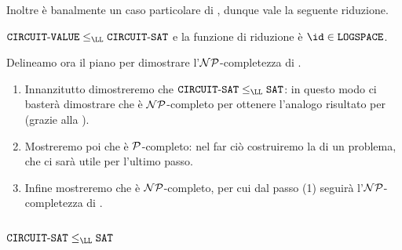Inoltre \CVAL{} è banalmente un caso particolare di \CSAT, dunque vale la seguente
riduzione.

\begin{proposition}
  $\CVAL \leq_{\LL} \CSAT$ e la funzione di riduzione è $\id \in \LOGSPACE$. 
\end{proposition}

Delineamo ora il piano per dimostrare l'$\NP$-completezza di \SAT{}.
\begin{enumerate}[(1)]
  \item Innanzitutto dimostreremo che $\CSAT \leq_{\LL} \SAT$: in questo modo
    ci basterà dimostrare che \CSAT{} è $\NP$-completo per ottenere l'analogo
    risultato per \SAT{} (grazie alla ).
  \item Mostreremo poi che \CVAL{} è $\P$-completo: nel far ciò costruiremo la
     di un problema, che ci sarà utile per 
    l'ultimo passo.
  \item Infine mostreremo che \CSAT{} è $\NP$-completo, per cui dal passo (1)
    seguirà l'$\NP$-completezza di \SAT. 
\end{enumerate} 

\subsection{\texorpdfstring{$\CSAT \leq_{\LL} \SAT$}
  {CIRCUIT-SAT si riduce efficientemente a SAT}}

